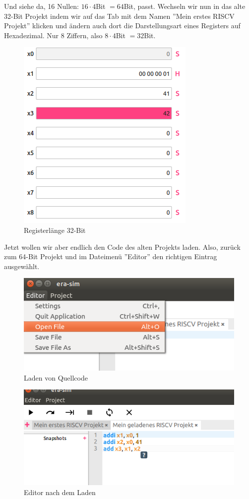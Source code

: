 Und siehe da, 16 Nullen: $16 \cdot 4$Bit $=64$Bit, passt. Wechseln wir nun in das
alte 32-Bit Projekt indem wir auf das Tab mit dem Namen ''Mein erstes RISCV
Projekt'' klicken und ändern auch dort die Darstellungsart eines Registers auf
Hexadezimal. Nur 8 Ziffern, also $8 \cdot 4$Bit $=32$Bit.
\begin{figure}[H]
	\centering
	\includegraphics[scale=1.0]{Images/first-steps-10.png}
	\caption{Registerlänge 32-Bit}
\end{figure}

Jetzt wollen wir aber endlich den Code des alten Projekts laden. Also, zurück zum
64-Bit Projekt und im Dateimenü ''Editor'' den richtigen Eintrag ausgewählt.
\begin{figure}[H]
	\centering
	\includegraphics[scale=1.0]{Images/first-steps-11.png}
	\caption{Laden von Quellcode}
\end{figure}

\begin{figure}[H]
	\centering
	\includegraphics[scale=1.0]{Images/first-steps-12.png}
	\caption{Editor nach dem Laden}
\end{figure}

